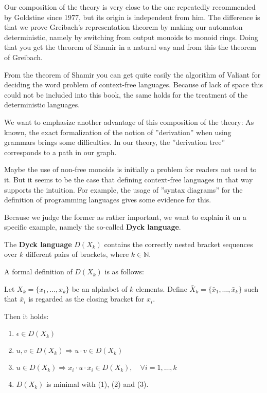 Our composition of the theory is very close to the one repeatedly recommended by
Goldstine since 1977, but its origin is independent from him. The difference is
that we prove Greibach's representation theorem by making our automaton deterministic,
namely by switching from output monoids to monoid rings. Doing that you get the
theorem of Shamir in a natural way and from this the theorem of Greibach.

From the theorem of Shamir you can get quite easily the algorithm of Valiant for
deciding the word problem of context-free languages. Because of lack of space
this could not be included into this book, the same holds for the treatment of
the  deterministic languages.

We want to emphasize another advantage of this composition of the theory: As
known, the exact formalization of the notion of ''derivation'' when using
grammars brings some difficulties. In our theory, the ''derivation tree''
corresponds to a path in our graph.

Maybe the use of non-free monoids is initially a problem for readers not used to
it. But it seems to be the case that defining context-free
languages in that way supports the intuition. For example, the usage of ''syntax
diagrams'' for the definition of programming languages gives some evidence for
this.

Because we judge the former as rather important, we want to explain it on a
specific example, namely the so-called {\bf Dyck language}.

The {\bf Dyck language} $D(X_k)$ contains the correctly nested bracket sequences
over $k$ different pairs of brackets, where $k \in \mathbb{N}$.

A formal definition of $D(X_k)$ is as follows:

Let $X_k = \{ x_1, \ldots, x_k \}$ be an alphabet of $k$ elements. Define
$\bar{X}_k = \{ \bar{x}_1, \ldots, \bar{x}_k \}$ such that $\bar{x}_i$ is regarded as the
closing bracket for $x_i$.

Then it holds:

\begin{enumerate}
  \item $\epsilon \in D(X_k)$
  \item $u, v \in D(X_k) \Rightarrow u \cdot v \in D(X_k)$
  \item $u \in D(X_k) \Rightarrow x_i \cdot u \cdot \bar{x}_i \in D(X_k),\quad
  \forall i = 1, \ldots, k$
  \item $D(X_k)$ is minimal with (1), (2) and (3). 
\end{enumerate}

